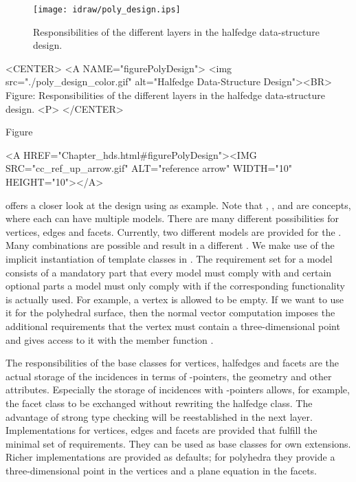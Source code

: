 \begin{ccTexOnly}
  \begin{figure}
    \begin{center}
      \parbox{0.7\textwidth}{%
          \texttt{[image: idraw/poly\_design.ips]}%
      }
    \end{center}
    \caption{Responsibilities of the different layers in the 
             halfedge data-structure design.}
    \label{figurePolyDesign}
  \end{figure}
\end{ccTexOnly}

\begin{ccHtmlOnly}
    <CENTER>
    <A NAME="figurePolyDesign">
        <img src="./poly_design_color.gif"
         alt="Halfedge Data-Structure Design"><BR>
    Figure: Responsibilities of the different layers in the 
            halfedge data-structure design.
    <P>
    </CENTER>
\end{ccHtmlOnly}

Figure~\ccTexHtml{\ref{figurePolyDesign}}{}\begin{ccHtmlOnly}
  <A HREF="Chapter_hds.html#figurePolyDesign"><IMG 
  SRC="cc_ref_up_arrow.gif" ALT="reference arrow" WIDTH="10" HEIGHT="10"></A>
\end{ccHtmlOnly}
offers a closer look at the design using  as example.
Note that , , 
and  are concepts, where each can have multiple
models. There are many different possibilities for vertices, edges and
facets. Currently, two different models are provided for the
. Many combinations are possible and
result in a different .  We make use of the
implicit instantiation of template classes in \CC.  The requirement
set for a model consists of a mandatory part that every model must
comply with and certain optional parts a model must only comply with
if the corresponding functionality is actually used. For example, a
vertex is allowed to be empty. If we want to use it for the polyhedral
surface, then the normal vector computation imposes the additional
requirements that the vertex must contain a three-dimensional point
and gives access to it with the member function .

The responsibilities of the base classes for vertices, halfedges and
facets are the actual storage of the incidences in terms of
-pointers, the geometry and other attributes. Especially the
storage of incidences with -pointers allows, for example,
the facet class to be exchanged without rewriting the halfedge class.
The advantage of strong type checking will be reestablished in the
next layer.  Implementations for vertices, edges and facets are
provided that fulfill the minimal set of requirements. They can be
used as base classes for own extensions.  Richer implementations are
provided as defaults; for polyhedra they provide a three-dimensional
point in the vertices and a plane equation in the facets.

